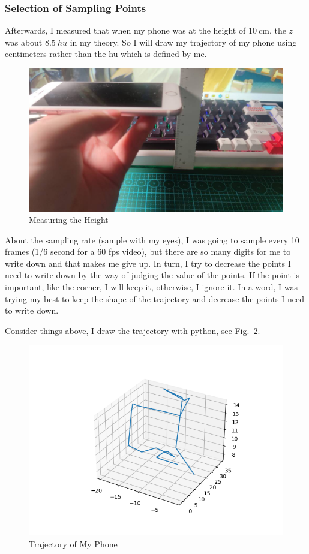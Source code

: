 \documentclass{article}
\begin{document}
\subsubsection{Selection of Sampling Points}

Afterwards, I measured that when my phone was at the height of $10~ \mathrm{cm}$, the $z$ was about $8.5 \mathrm~{hu}$ in my theory. So I will draw my trajectory of my phone using centimeters rather than the hu which is defined by me.  

\begin{figure}[!h]
	\centering
	\includegraphics[width=3 in]{../pic/phoneHeight.jpg}
	\caption{Measuring the Height}
	\label{fig:phoneHeight}
\end{figure}

About the sampling rate (sample with my eyes), I was going to sample every 10 frames (1/6 second for a $60$ fps video), but there are so many digits for me to write down and that makes me give up. In turn, I try to decrease the points I need to write down by the way of judging the value of the points. If the point is important, like the corner, I will keep it, otherwise, I ignore it. In a word, I was trying my best to keep the shape of the trajectory and decrease the points I need to write down.

Consider things above, I draw the trajectory with python, see Fig.~\ref{fig:trajectoryOfMyPhone}.

\begin{figure}[!h]
	\centering
	\includegraphics[width=4 in]{../pic/trajectoryOfMyPhone.png}
	\caption{Trajectory of My Phone}
	\label{fig:trajectoryOfMyPhone}
\end{figure}
\end{document}
